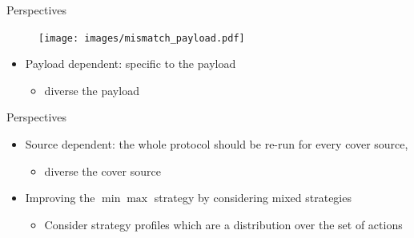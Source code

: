 \documentclass[10pt,aspectratio=169]{beamer}
\begin{document}
\begin{frame}{Perspectives}

    \begin{figure}[h]
        \texttt{[image: images/mismatch\_payload.pdf]}
    \end{figure}
    
    \begin{itemize}
        \item Payload dependent: specific to the payload
            \begin{itemize}
                \item diverse the payload
            \end{itemize}
    \end{itemize}


\end{frame}



\begin{frame}{Perspectives}
  
    \begin{itemize}
        \setlength\itemsep{2em}
    
        \item Source dependent: the whole protocol should be re-run for every cover source,  
                
            \begin{itemize}
                \item diverse the cover source
            \end{itemize}
            
        \pause 
        
        \item Improving the $\min\max$ strategy by considering mixed strategies
            \begin{itemize}
                \item Consider strategy profiles which are a distribution over the set of actions
            \end{itemize}
    
    \end{itemize}

\end{frame}


%
%
\end{document}
